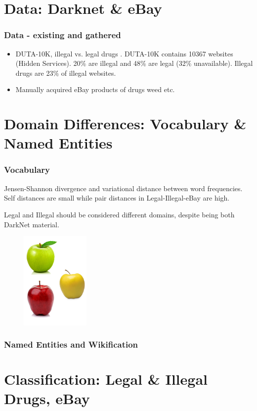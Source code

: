 \documentclass[t,xcolor={svgnames,table}]{beamer}
\begin{document}
\section{Data: Darknet \& eBay}

\begin{frame}
	\frametitle{Data - existing and gathered}
	\begin{itemize}
		\item DUTA-10K, illegal vs. legal drugs \cite{AlNabki19}.
		DUTA-10K contains 10367 websites (Hidden Services).
		20\% are illegal and 48\% are legal (32\% unavailable).
		Illegal drugs are 23\% of illegal websites.
		\item Manually acquired eBay products of drugs weed etc.
	\end{itemize}
\end{frame}

\section{Domain Differences: Vocabulary \& Named Entities}

\begin{frame}
	\frametitle{Vocabulary}
	Jensen-Shannon divergence and variational distance between word frequencies.
	Self distances are small while pair distances in Legal-Illegal-eBay are high.
	
	Legal and Illegal should be considered different domains, despite being both DarkNet material.
	\begin{figure}
		\centering
		\includegraphics[width=0.3\textwidth]{3different.png}
	\end{figure}

\end{frame}

\begin{frame}
	\frametitle{Named Entities and Wikification}
\end{frame}

\section{Classification: Legal \& Illegal Drugs, eBay}
\end{document}
